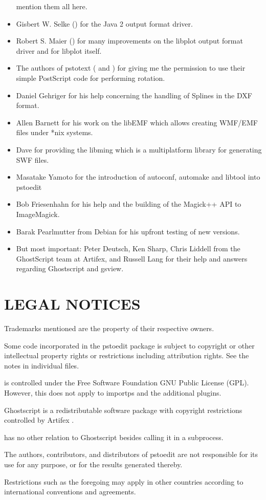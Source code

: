 \documentclass[english,a4paper]{article}
\begin{document}
\begin{itemize}
     mention them all here.
  \item Gisbert W. Selke () for the Java 2 output format driver.
  \item Robert S. Maier () for many improvements on
	the libplot output format driver and for libplot itself.
  \item The authors of pstotext ( and )
	for giving me the permission to use their simple PostScript code for
	performing rotation.
  \item Daniel Gehriger  for his help concerning the handling of Splines in the DXF format.
  \item Allen Barnett  for his work on the libEMF which allows creating WMF/EMF files under *nix systems.
  \item Dave  for providing the libming which is a multiplatform library for generating SWF files.
  \item Masatake Yamoto for the introduction of autoconf, automake and libtool into pstoedit
  \item Bob Friesenhahn for his help and the building of the Magick++ API to ImageMagick.
  \item Barak Pearlmutter from Debian for his upfront testing of new versions.
  \item But most important: Peter Deutsch, Ken Sharp, Chris Liddell from the GhostScript team at Artifex, and Russell
        Lang  for their help and answers regarding Ghostscript and gsview.
\end{itemize}

\section{LEGAL NOTICES}

Trademarks mentioned are the property of their respective owners.

Some code incorporated in the pstoedit package is subject to copyright or
other intellectual property rights or restrictions including attribution
rights. See the notes in individual files.

 is controlled under the Free Software Foundation GNU Public
License (GPL). However, this does not apply to importps and the additional
plugins.

Ghostscript is a redistributable software package with copyright
restrictions controlled by Artifex .

 has no other relation to Ghostscript besides calling it in a
subprocess.

The authors, contributors, and distributors of pstoedit are not responsible
for its use for any purpose, or for the results generated thereby.

Restrictions such as the foregoing may apply in other countries according to
international conventions and agreements.


\LatexManEnd
\end{document}
